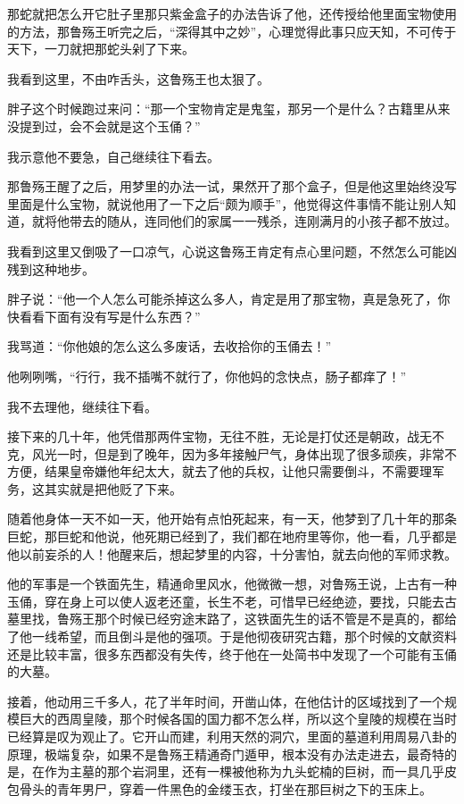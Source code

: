 那蛇就把怎么开它肚子里那只紫金盒子的办法告诉了他，还传授给他里面宝物使用的方法，那鲁殇王听完之后，“深得其中之妙”，心理觉得此事只应天知，不可传于天下，一刀就把那蛇头剁了下来。

我看到这里，不由咋舌头，这鲁殇王也太狠了。

胖子这个时候跑过来问：“那一个宝物肯定是鬼玺，那另一个是什么？古籍里从来没提到过，会不会就是这个玉俑？”

我示意他不要急，自己继续往下看去。

那鲁殇王醒了之后，用梦里的办法一试，果然开了那个盒子，但是他这里始终没写里面是什么宝物，就说他用了一下之后“颇为顺手”，他觉得这件事情不能让别人知道，就将他带去的随从，连同他们的家属一一残杀，连刚满月的小孩子都不放过。

我看到这里又倒吸了一口凉气，心说这鲁殇王肯定有点心里问题，不然怎么可能凶残到这种地步。

胖子说：“他一个人怎么可能杀掉这么多人，肯定是用了那宝物，真是急死了，你快看看下面有没有写是什么东西？”

我骂道：“你他娘的怎么这么多废话，去收拾你的玉俑去！”

他咧咧嘴，“行行，我不插嘴不就行了，你他妈的念快点，肠子都痒了！”

我不去理他，继续往下看。

接下来的几十年，他凭借那两件宝物，无往不胜，无论是打仗还是朝政，战无不克，风光一时，但是到了晚年，因为多年接触尸气，身体出现了很多顽疾，非常不方便，结果皇帝嫌他年纪太大，就去了他的兵权，让他只需要倒斗，不需要理军务，这其实就是把他贬了下来。

随着他身体一天不如一天，他开始有点怕死起来，有一天，他梦到了几十年的那条巨蛇，那巨蛇和他说，他死期已经到了，我们都在地府里等你，他一看，几乎都是他以前妄杀的人！他醒来后，想起梦里的内容，十分害怕，就去向他的军师求教。

他的军事是一个铁面先生，精通命里风水，他微微一想，对鲁殇王说，上古有一种玉俑，穿在身上可以使人返老还童，长生不老，可惜早已经绝迹，要找，只能去古墓里找，鲁殇王那个时候已经穷途末路了，这铁面先生的话不管是不是真的，都给了他一线希望，而且倒斗是他的强项。于是他彻夜研究古籍，那个时候的文献资料还是比较丰富，很多东西都没有失传，终于他在一处简书中发现了一个可能有玉俑的大墓。

接着，他动用三千多人，花了半年时间，开凿山体，在他估计的区域找到了一个规模巨大的西周皇陵，那个时候各国的国力都不怎么样，所以这个皇陵的规模在当时已经算是叹为观止了。它开山而建，利用天然的洞穴，里面的墓道利用周易八卦的原理，极端复杂，如果不是鲁殇王精通奇门遁甲，根本没有办法走进去，最奇特的是，在作为主墓的那个岩洞里，还有一棵被他称为九头蛇楠的巨树，而一具几乎皮包骨头的青年男尸，穿着一件黑色的金缕玉衣，打坐在那巨树之下的玉床上。

